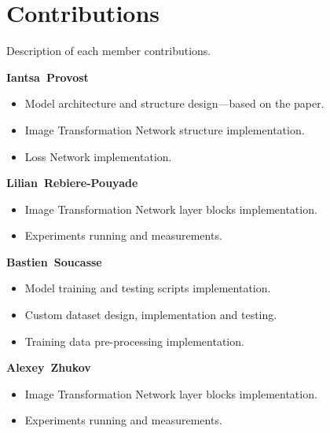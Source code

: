 \documentclass{article}
\begin{document}
{
    \newpage
    \section*{Contributions}
    \label{sec:contributions}

    Description of each member contributions.

    \bigskip

    \textbf{Iantsa~Provost}

    \begin{itemize}
        \item Model architecture and structure design---based on the paper.
        \item Image Transformation Network structure implementation.
        \item Loss Network implementation.
    \end{itemize}

    \bigskip

    \textbf{Lilian~Rebiere-Pouyade}

    \begin{itemize}
        \item Image Transformation Network layer blocks implementation.
        \item Experiments running and measurements.
    \end{itemize}

    \bigskip

    \textbf{Bastien~Soucasse}

    \begin{itemize}
        \item Model training and testing scripts implementation.
        \item Custom dataset design, implementation and testing.
        \item Training data pre-processing implementation.
    \end{itemize}

    \bigskip

    \textbf{Alexey~Zhukov}

    \begin{itemize}
        \item Image Transformation Network layer blocks implementation.
        \item Experiments running and measurements.
    \end{itemize}
}

{
    \newpage
    
}
\end{document}
